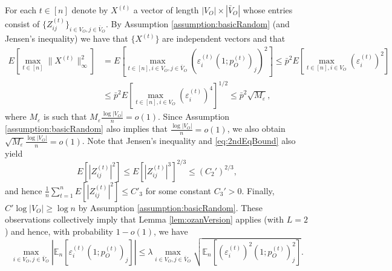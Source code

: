 \documentclass[opre,nonblindrev]{informs3} %
\def\En{{\mathbb{E}_n}}
\begin{document}
\begin{APPENDIX}{}
 	
 	For each $t\in[n]$ denote by
 	$X^{(t)}$   a  vector of length $|V_O| \times |\bar{V}_O|$ whose entries consist of
 	$\{Z^{(t)}_{ij}\}_{ i\in V_O,j \in \bar{V}_O }$.
 	By  Assumption \ref{assumption:basicRandom} (and Jensen's inequality) we have  that
 	$\{X^{(t)}\}$ are independent vectors and that
 	\begin{equation}
 	\begin{aligned}
 	E[\max_{t\in[n] } \|X^{(t)}\|_\infty^2 ] &= E[  \max_{t \in [n],i\in {V}_O,j\in \bar{V}_O}
 	(\varepsilon_i^{(t) }(1;p_O^{(t)})_j)^2 ] 
 	\leq \bar{p}^2 E\left[
 	\max_{t \in [n],i\in {V}_O}
 	(\varepsilon_i^{(t) })^2
 	\right]\\
 	& \leq 
 	\bar{p}^2 E\left[
 	\max_{t \in [n],i\in {V}_O}
 	(\varepsilon_i^{(t) })^4
 	\right]^{1/2}
 	\leq
 	\bar{p}^2 \sqrt{M_\varepsilon},
 	\end{aligned}
 	\end{equation}
 	where $M_\varepsilon$ is such that
 	$ {M}_\varepsilon \frac{\log |V_O|}{n} = o(1)$.
 	Since Assumption \ref{assumption:basicRandom} also implies that
 	$\frac{\log |V_O|}{n}=o(1)$, we also
 	obtain
 	$ \sqrt{M_\varepsilon} \frac{\log |V_O|}{n} = o(1)$.
 	Note that
 	Jensen's inequality and \eqref{eq:2ndEqBound}  also yield
 	\begin{equation}\label{eq:Lem12IntBound}
 	E[|Z^{(t)}_{ij}|^2] \leq 
 	E[|Z^{(t)}_{ij}|^3]^{2/3} \leq (C_2')^{2/3},
 	\end{equation}
 	and hence
 	$\frac{1}{n}\sum_{t=1}^nE[|Z^{(t)}_{ij}|^2]\leq C'_3$ for some constant $C_3'>0$.	
 	Finally, $ C' \log |V_O| \geq  \log n$ by  Assumption \ref{assumption:basicRandom}.
 	These observations collectively imply  that Lemma \ref{lem:ozanVersion} applies (with $L=2$) and hence,
 	with probability
 	$1-o(1) $,
 	we have
 	\begin{equation}\label{eq:auxBoundLinfStep2_o}
 	\max_{i\in V_O,j\in{ \bar{V}}_O} |{\mathbb{E}_n[\varepsilon_i^{(t)}(1;p_O^{(t)})_j] 
 	}|
 	\leq
 	\lambda  \max_{i\in V_O,j\in{ \bar{V}}_O}  \sqrt{  \En[(\varepsilon_i^{(t)} )^2 (1;p_O^{(t)})_j^2 ]}.
 	\end{equation}
 	

\end{APPENDIX}
\end{document}
